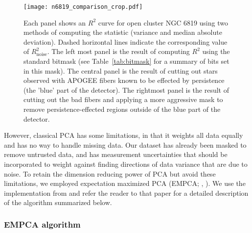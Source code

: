 \documentclass[a4paper,fleqn,usenatbib]{mnras}
\newcommand       \Rsq      {{R^2}}
\newcommand       \Rnoise   {{R^2_{\mathrm{noise}}}}
\begin{document}
\begin{figure*}
\centering
\texttt{[image: n6819\_comparison\_crop.pdf]}
\caption{Each panel shows an $\Rsq$ curve for open cluster NGC 6819 using two methods of computing the statistic (variance and median absolute deviation). Dashed horizontal lines indicate the corresponding value of $\Rnoise$. The left most panel is the result of computing $\Rsq$ using the standard bitmask (see Table~\ref{tab:bitmask} for a summary of bits set in this mask). The central panel is the result of cutting out stars observed with APOGEE fibers known to be effected by persistence (the 'blue' part of the detector). The rightmost panel is the result of cutting out the bad fibers and applying a more aggressive mask to remove persistence-effected regions outside of the blue part of the detector.}
\label{fig:n6819R2}
\end{figure*}

However, classical PCA has some limitations, in that it weights all data equally and has no way to handle missing data. Our dataset has already been masked to remove untrusted data, and has measurement uncertainties that should be incorporated to weight against finding directions of data variance that are due to noise. To retain the dimension reducing power of PCA but avoid these limitations, we employed expectation maximized PCA (EMPCA; \citealt{Dempster1977}, \citealt{Roweis1997}). We use the implementation from \citet{Bailey2012} and refer the reader to that paper for a detailed description of the algorithm summarized below.

\subsubsection{EMPCA algorithm}
\label{sec:EMPCA}
\end{document}

